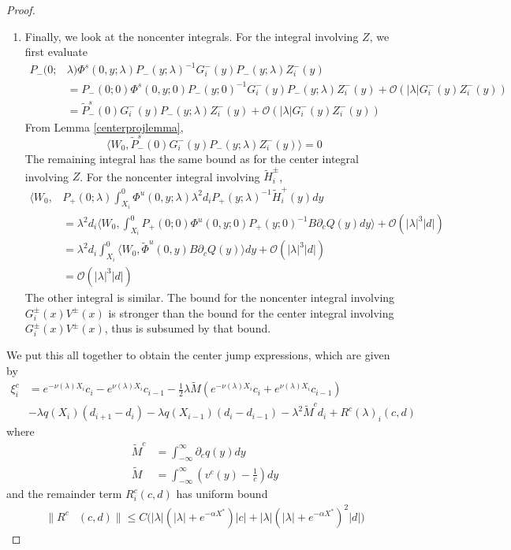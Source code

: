 \documentclass[thesis.tex]{subfiles}
\begin{document}
\begin{lemma}
\begin{proof}
\begin{enumerate}
\item Finally, we look at the noncenter integrals. For the integral involving $Z$, we first evaluate 
\begin{align*}
P_-(0; &\lambda) \Phi^s(0, y; \lambda) P_-(y; \lambda)^{-1} G_i^-(y) P_-(y; \lambda)Z_i^-(y) \\
&= P_-(0; 0) \Phi^s(0, y; 0) P_-(y; 0)^{-1}G_i^-(y) P_-(y; \lambda)Z_i^-(y) + \mathcal{O}(|\lambda| G_i^-(y) Z_i^-(y)) \\
&= \tilde{P}_-^s(0)G_i^-(y) P_-(y; \lambda)Z_i^-(y) + \mathcal{O}(|\lambda| G_i^-(y) Z_i^-(y))
\end{align*}
From Lemma \ref{centerprojlemma},
\[
\langle W_0, \tilde{P}_-^s(0)G_i^-(y) P_-(y; \lambda)Z_i^-(y) \rangle = 0
\]
The remaining integral has the same bound as for the center integral involving $Z$. For the noncenter integral involving $\tilde{H}_i^\pm$, 
\begin{align*}
\langle W_0, 
&P_+(0; \lambda) \int_{X_i}^0 \Phi^u(0, y; \lambda) \lambda^2 d_i P_+(y; \lambda)^{-1} \tilde{H}_i^+(y) dy\\
&= \lambda^2 d_i \langle W_0, \int_{X_i}^0 P_+(0; 0) \Phi^u(0, y; 0) P_+(y; 0)^{-1} B \partial_c Q(y) dy \rangle + \mathcal{O}(|\lambda|^3 |d| ) \\
&= \lambda^2 d_i \int_{X_i}^0 \langle W_0, \tilde{\Phi}^u(0, y)  B \partial_c Q(y) \rangle dy + \mathcal{O}(|\lambda|^3 |d| ) \\
&= \mathcal{O}(|\lambda|^3 |d| ) 
\end{align*}
The other integral is similar. The bound for the noncenter integral involving $G_i^\pm(x) V^\pm(x)$ is stronger than the bound for the center integral involving $G_i^\pm(x) V^\pm(x)$, thus is subsumed by that bound.
\end{enumerate}

We put this all together to obtain the center jump expressions, which are given by
\begin{align*}
\xi^c_i &= e^{-\nu(\lambda)X_i} c_i - e^{\nu(\lambda)X_i} c_{i-1} - \frac{1}{2}\lambda \tilde{M} \left( e^{-\nu(\lambda)X_i}c_i + e^{\nu(\lambda)X_i}c_{i-1}\right)\\
&- \lambda q(X_i) (d_{i+1} - d_i ) - \lambda q(X_{i-1}) (d_i - d_{i-1} )
- \lambda^2 \tilde{M}^c d_i + R^c(\lambda)_i(c, d)
\end{align*}
where
\begin{align*}
\tilde{M}^c &= \int_{-\infty}^\infty \partial_c q(y) dy \\
\tilde{M} &= \int_{-\infty}^{\infty} \left(v^c(y) - \frac{1}{c}\right) dy
\end{align*}
and the remainder term $R^c_i(c, d)$ has uniform bound
\begin{equation}\label{centerR}
\begin{aligned}
\|R^c&(c, d)\| \leq C \Big( |\lambda|(|\lambda| + e^{-\alpha X^*})|c| + |\lambda| (|\lambda| + e^{-\alpha X^*})^2 |d| \Big)
\end{aligned}
\end{equation}


\end{proof}
\end{lemma}
\end{document}
